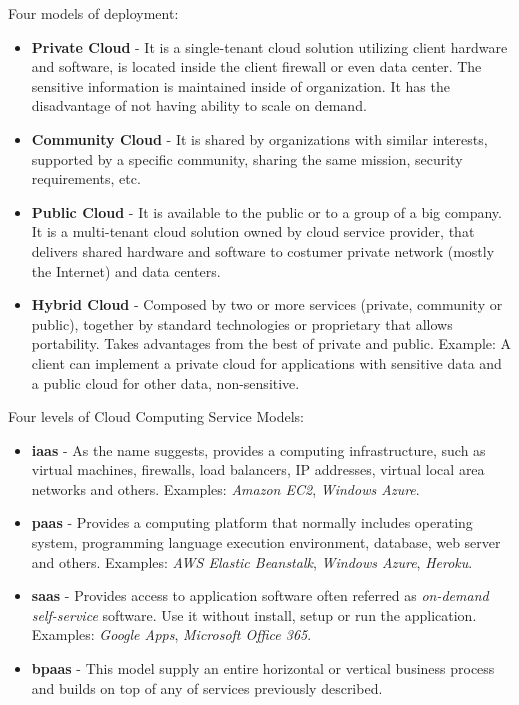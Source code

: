 Four models of deployment:
\begin{itemize}
	\item \textbf{Private Cloud}   - It is a single-tenant cloud solution utilizing client hardware and software, is located inside the client firewall or even data center. The sensitive information is maintained inside of organization. It has the disadvantage of not having ability to scale on demand.

	\item \textbf{Community Cloud} - It is shared by organizations with similar interests, supported by a specific community, sharing the same mission, security requirements, etc.

	\item \textbf{Public Cloud}    - It is available to the public or to a group of a big company. It is a multi-tenant cloud solution owned by cloud service provider, that delivers shared hardware and software to costumer private network (mostly the Internet) and data centers.

	\item \textbf{Hybrid Cloud}    - Composed by two or more services (private, community or public), together by standard technologies or proprietary that allows portability. Takes advantages from the best of private and public. Example: A client can implement a private cloud for applications with sensitive data and a public cloud for other data, non-sensitive.
\end{itemize}

Four levels of Cloud Computing Service Models:

\begin{itemize}
	\item \textbf{\acl{iaas}} - As the name suggests, provides a computing infrastructure, such as virtual machines, firewalls, load balancers, IP addresses, virtual local area networks and others. Examples: \textit{Amazon EC2}, \textit{Windows Azure}.

	\item \textbf{\acl{paas}} - Provides a computing platform that normally includes operating system, programming language execution environment, database, web server and others. Examples: \textit{AWS Elastic Beanstalk}, \textit{Windows Azure}, \textit{Heroku}.

	\item \textbf{\acl{saas}} - Provides access to application software often referred as \textit{on-demand self-service} software. Use it without install, setup or run the application.
	Examples: \textit{Google Apps}, \textit{Microsoft Office 365}.

	\item \textbf{\acl{bpaas}} - This model supply an entire horizontal or vertical business process and builds on top of any of services previously described.

\end{itemize}

